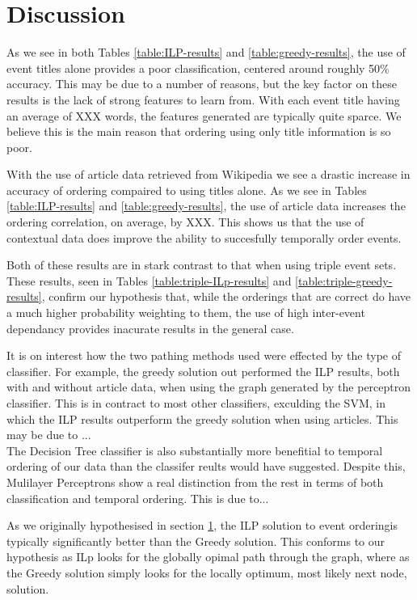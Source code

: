 \documentclass[bsc,frontabs,twoside,singlespacing,parskip,deptreport]{infthesis}     %
\begin{document}
\section{Discussion}

As we see in both Tables \ref{table:ILP-results} and \ref{table:greedy-results}, the use of event titles alone
provides a poor classification, centered around roughly 50\% accuracy. This may be due to a number of reasons,
but the key factor on these results is the lack of strong features to learn from. With each event title having an average of
XXX words, the features generated are typically quite sparce. We believe this is the main reason that ordering using
only title information is so poor.

With the use of article data retrieved from Wikipedia we see a drastic increase in accuracy of ordering compaired to using
titles alone. As we see in Tables \ref{table:ILP-results} and \ref{table:greedy-results}, the use of article data
increases the ordering correlation, on average, by XXX. This shows us that the use of contextual data does improve the ability
to succesfully temporally order events.

Both of these results are in stark contrast to that when using triple event sets. These results, seen in Tables
\ref{table:triple-ILp-results} and \ref{table:triple-greedy-results}, confirm our hypothesis that, while the orderings
that are correct do have a much higher probability weighting to them, the use of high inter-event dependancy provides
inacurate results in the general case.

It is on interest how the two pathing methods used were effected by the type of classifier.
For example, the greedy solution out performed the ILP results, both with and without article data,
when using the graph generated by the perceptron classifier. This is in contract to most other classifiers, exculding
the SVM, in which the ILP results outperform the greedy solution when using articles. This may be due to ...\\

The Decision Tree classifier is also substantially more benefitial to temporal ordering of our data than the classifer
reults would have suggested. Despite this, Mulilayer Perceptrons show a real distinction from the rest in terms of both
classification and temporal ordering. This is due to...


As we originally hypothesised in section \ref{}, the ILP solution to event orderingis typically significantly
better than the Greedy solution. This conforms to our hypothesis as ILp looks for the globally opimal path through
the graph, where as the Greedy solution simply looks for the locally optimum, most likely next node, solution.
\end{document}
